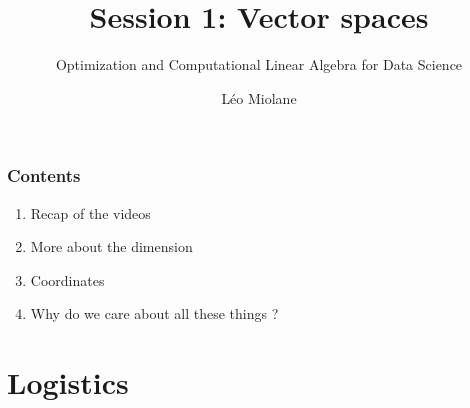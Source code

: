 \documentclass{beamer}
\title{Session 1: Vector spaces}
\subtitle{Optimization and Computational Linear Algebra for Data Science}
\author{Léo Miolane}
\date{}
\begin{document}
\setcounter{showProgressBar}{0}
\setcounter{showSlideNumbers}{0}

\frame{\titlepage}

\begin{frame}
	\frametitle{Contents}
	\begin{enumerate}
		\item Recap of the videos
		\item More about the dimension
		\item Coordinates
		\item Why do we care about all these things ? 
	\end{enumerate}
\end{frame}

\newcommand{\grid}{%
	\begin{tikzpicture}[overlay]
		\useasboundingbox (0,0) rectangle(\slidewidth,\slideheight);
		\draw[step=0.5,ExecusharesGrid,thin,xshift=12.0cm,yshift=0.76cm] (-13.5cm,-8.8cm) grid (0.0,0.0)
	\end{tikzpicture}
	\vspace{-0.5cm}
}

\setcounter{framenumber}{0}
\setcounter{showSlideNumbers}{1}

\section{Logistics}
\end{document}
